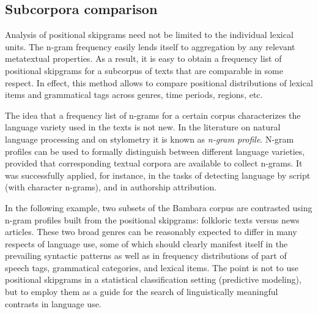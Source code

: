 \documentclass[12pt]{article}
\begin{document}
\subsection{Subcorpora comparison}


Analysis of positional skipgrams need not be limited to the individual
lexical units. The n-gram frequency easily lends itself to aggregation
by any relevant metatextual properties. As a result, it is easy to
obtain a frequency list of positional skipgrams for a subcorpus of
texts that are comparable in some respect. In effect, this method
allows to compare positional distributions of lexical items and
grammatical tags across genres, time periods, regions, etc.

The idea that a frequency list of n-grams for a certain corpus
characterizes the language variety used in the texts is not new. In
the literature on natural language processing and on stylometry it is
known as \textit{n-gram profile}. N-gram profiles can be used to
formally distinguish between different language varieties, provided
that corresponding textual corpora are available to collect n-grams.
It was successfully applied, for instance, in the tasks of detecting
language by script (with character n-grams), and
in authorship attribution.

In the following example, two subsets of the Bambara corpus are
contrasted using n-gram profiles built from the positional skipgrams:
folkloric texts versus news articles. These two broad genres can be
reasonably expected to differ in many respects of language use, some
of which should clearly manifest itself in the prevailing syntactic
patterns as well as in frequency distributions of part of speech tags,
grammatical categories, and lexical items. The point is not to use
positional skipgrams in a statistical classification setting
(predictive modeling), but to employ them as a guide for the search of
linguistically meaningful contrasts in language use.
\end{document}
